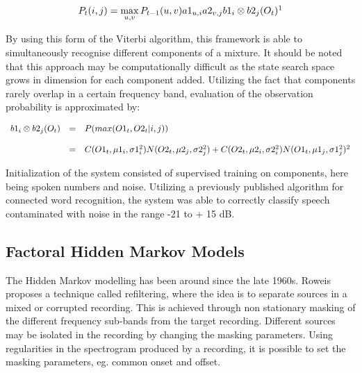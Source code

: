 \documentclass[11pt, oneside, a4paper]{report}
\begin{document}
\begin{equation}\label{vargasEqn2}
P_t(i,j) = \max_{u,v} P_{t-1} (u, v) a1_{u,i} a2_{v,j} b1_i \otimes b2_j (O_t)  \footnotemark
\end{equation}


By using this form of the Viterbi algorithm, this framework is able to simultaneously recognise different components of a mixture. It should be noted that this approach may be computationally difficult as the state search space grows in dimension for each component added.
Utilizing the fact that components rarely overlap in a certain frequency band, evaluation of the observation probability is approximated by:

\begin{equation}\label{vargasEqn3}
\begin{array}{lcl}
b1_i \otimes b2_j(O_t) &=&  P(max(O1_t, O2_t|i,j)) \\
\\ &  = &  C(O1_t,\mu1_i,\sigma1^2_i)N(O2_t, \mu2_j,\sigma2^2_j) + C(O2_t,\mu2_i,\sigma2^2_i)N(O1_t, \mu1_j,\sigma1^2_j)\footnotemark\\
\end{array}
\end{equation}


Initialization of the system consisted of supervised training on components, here being spoken numbers and noise. Utilizing a previously published algorithm for connected word recognition, the system was able to correctly classify speech contaminated with noise in the range -21 to + 15 dB. 


\subsection{Factoral Hidden Markov Models} %
The Hidden Markov modelling has been around since the late 1960s. Roweis\cite{roweisOneMic} proposes a technique called refiltering, where the idea is to separate sources in a mixed or corrupted recording. This is achieved through non stationary masking of the different frequency sub-bands from the target recording. Different sources may be isolated in the recording by changing the masking parameters. Using regularities in the spectrogram produced by a recording, it is possible to set the masking parameters, eg. common onset and offset. 
\end{document}
